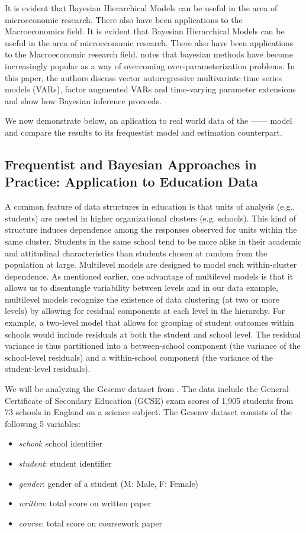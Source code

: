 It is evident that Bayesian Hierarchical Models can be useful in the area of microeconomic research. There also have been applications to the Macroeconomics field. It is evident that Bayesian Hierarchical Models can be useful in the area of microeconomic research. There also have been applications to the Macroeconomic research field. \cite{ koop2010bayesian} notes that bayesian methods have become increasingly popular as a way of overcoming over-parameterization problems. In this paper, the authors discuss vector autoregressive multivariate time
series models (VARs), factor augmented VARs and time-varying parameter extensions and show how Bayesian inference proceeds. 

We now demonstrate below, an aplication to real world data of the ------ model and compare the results to its frequestist model and estimation counterpart.

\subsection{Frequentist and Bayesian Approaches in Practice: Application to Education Data}

A common feature of data structures in education is that units of analysis (e.g., students) are nested in higher organizational clusters (e.g. schools). This kind of structure induces dependence among the responses observed for units within the same cluster. Students in the same school tend to be more alike in their academic and attitudinal characteristics than students chosen at random from the population at large. Multilevel models are designed to model such within-cluster dependence. As mentioned earlier, one advantage of multilevel models is that it allows us to disentangle variability between levels and in our data example,  multilevel models recognize the existence of data clustering (at two or more levels) by allowing for residual components at each level in the hierarchy. For example, a two-level model that allows for grouping of student outcomes within schools would include residuals at both the student and school level. The residual variance is thus partitioned into a between-school component (the variance of the school-level residuals) and a within-school component (the variance of the student-level residuals). 


We will be analyzing the Gcsemv dataset from \cite{rasbash2000user}. The data include the General Certificate of Secondary Education (GCSE) exam scores of 1,905 students from 73 schools in England on a science subject. The Gcsemv dataset consists of the following 5 variables:
\begin{itemize}
	\item \textit{school}: school identifier
	\item \textit{student}: student identifier
	\item \textit{gender}: gender of a student (M: Male, F: Female)
	\item \textit{written}: total score on written paper
	\item \textit{course}: total score on coursework paper
\end{itemize}

